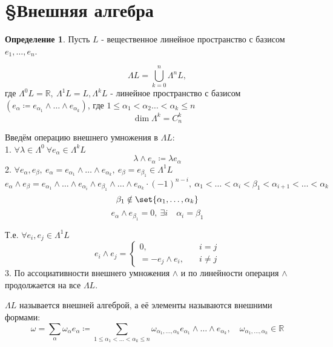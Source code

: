 \documentclass[a4paper]{article}
\DeclarePairedDelimiter\set\{\}
\theoremstyle{definition}
\newtheorem*{definition}{Определение}
\theoremstyle{remark}
\begin{document}
\newpage
\section*{\centering \S Внешняя алгебра}
\begin{tcolorbox}
\begin{definition}
    Пусть $ L $ - вещественное линейное пространство с базисом $ e_1, \dots, e_n $.

    \[
        \Lambda L = \bigcup_{k=0}^{n} \Lambda^n L,
    \]
    где $ \Lambda^0 L = \mathbb{R}, \ \Lambda^1 L = L, \Lambda^k L $ - линейное пространство
    с базисом $ (e_{\alpha} \coloneq e_{\alpha_1} \wedge \dots \wedge e_{\alpha_k}) $,
    где $ 1 \leq \alpha_1 < \alpha_2 \dots < \alpha_k \leq n $ 
    \[
        \dim \Lambda^k = C_n^k
    \]
\end{definition}
\end{tcolorbox}

Введём операцию внешнего умножения в $ \Lambda L: $\\
1. $ \forall \lambda \in \Lambda^0 \ \forall e_{\alpha} \in \Lambda^k L $ 
\[
    \lambda \wedge e_{\alpha} \coloneq \lambda e_{\alpha}
\]
2. $ \forall e_{\alpha}, e_{\beta}, \ e_{\alpha} = e_{\alpha_1} \wedge \dots
\wedge e_{\alpha_k}, \ e_{\beta} = e_{\beta_1} \in \Lambda^1 L $ 
\[
    e_{\alpha} \wedge e_{\beta} = e_{\alpha_1} \wedge \dots \wedge e_{\alpha_i}
    \wedge e_{\beta_1} \wedge \dots \wedge e_{\alpha_k} \cdot (-1)^{n-i},
    \ \alpha_1 < \dots
    < \alpha_i < \beta_1 < \alpha_{i+1} < \dots < \alpha_k
\]
\[
    \beta_1 \notin \set{\alpha_1, \dots, \alpha_k}
\]
\[
    e_{\alpha} \wedge e_{\beta_1} = 0, \ \exists i \quad \alpha_i = \beta_1
\]

Т.е. $ \forall e_i, e_j \in \Lambda^1 L $ 
\[
    e_i \wedge e_j = 
    \begin{cases}
        0, &\quad i = j\\
        =-e_j \wedge e_i, &\quad i \neq j
    \end{cases}
\]
3. По ассоциативности внешнего умножения $ \wedge $ и по линейности операция
$ \wedge $ продолжается на все $ \Lambda L $.

$ \Lambda L $ называется внешней алгеброй, а её элементы называются внешними
формами:
\[
    \omega = \sum_{\alpha} \omega_{\alpha} e_{\alpha}
    \coloneq \sum_{1 \leq \alpha_1 < \dots < \alpha_k \leq n} 
    \omega_{\alpha_1, \dots, \alpha_k} e_{\alpha_1} \wedge \dots \wedge
    e_{\alpha_k}, \quad \omega_{\alpha_1, \dots, \alpha_k} \in \mathbb{R}
\]
\end{document}
